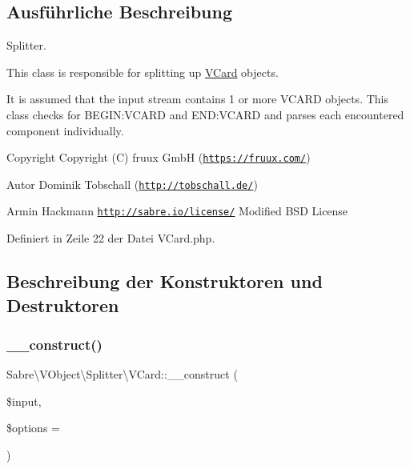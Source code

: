 \subsection{Ausführliche Beschreibung}
Splitter.

This class is responsible for splitting up \mbox{\hyperlink{class_sabre_1_1_v_object_1_1_splitter_1_1_v_card}{V\+Card}} objects.

It is assumed that the input stream contains 1 or more V\+C\+A\+RD objects. This class checks for B\+E\+G\+IN\+:V\+C\+A\+RD and E\+ND\+:V\+C\+A\+RD and parses each encountered component individually.

\begin{DoxyCopyright}{Copyright}
Copyright (C) fruux GmbH (\href{https://fruux.com/}{\tt https\+://fruux.\+com/}) 
\end{DoxyCopyright}
\begin{DoxyAuthor}{Autor}
Dominik Tobschall (\href{http://tobschall.de/}{\tt http\+://tobschall.\+de/}) 

Armin Hackmann  \href{http://sabre.io/license/}{\tt http\+://sabre.\+io/license/} Modified B\+SD License 
\end{DoxyAuthor}


Definiert in Zeile 22 der Datei V\+Card.\+php.



\subsection{Beschreibung der Konstruktoren und Destruktoren}
\mbox{\label{class_sabre_1_1_v_object_1_1_splitter_1_1_v_card_a1cff6b026f7995b3cc3dc8516bf7a24c}} 
\subsubsection{\texorpdfstring{\+\_\+\+\_\+construct()}{\_\_construct()}}
{\footnotesize\ttfamily Sabre\textbackslash{}\+V\+Object\textbackslash{}\+Splitter\textbackslash{}\+V\+Card\+::\+\_\+\+\_\+construct (\begin{DoxyParamCaption}\item[{}]{\$input,  }\item[{}]{\$options = {} }\end{DoxyParamCaption})}

